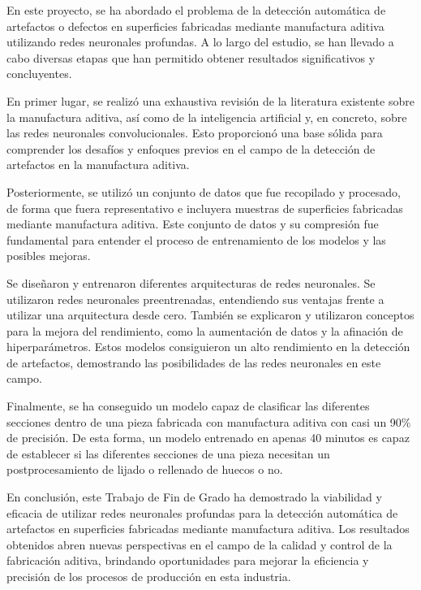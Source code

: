 \documentclass{report}
\begin{document}
En este proyecto, se ha abordado el problema de la detección automática de artefactos o defectos en superficies fabricadas mediante manufactura aditiva utilizando redes neuronales profundas. A lo largo del estudio, se han llevado a cabo diversas etapas que han permitido obtener resultados significativos y concluyentes.

En primer lugar, se realizó una exhaustiva revisión de la literatura existente sobre la manufactura aditiva, así como de la inteligencia artificial y, en concreto, sobre las redes neuronales convolucionales. Esto proporcionó una base sólida para comprender los desafíos y enfoques previos en el campo de la detección de artefactos en la manufactura aditiva.

Posteriormente, se utilizó un conjunto de datos que fue recopilado y procesado, de forma que fuera representativo e incluyera muestras de superficies fabricadas mediante manufactura aditiva. Este conjunto de datos y su compresión fue fundamental para entender el proceso de entrenamiento de los modelos y las posibles mejoras.

Se diseñaron y entrenaron diferentes arquitecturas de redes neuronales. Se utilizaron redes neuronales preentrenadas, entendiendo sus ventajas frente a utilizar una arquitectura desde cero. También se explicaron y utilizaron conceptos para la mejora del rendimiento, como la aumentación de datos y la afinación de hiperparámetros. Estos modelos consiguieron un alto rendimiento en la detección de artefactos, demostrando las posibilidades de las redes neuronales en este campo.

Finalmente, se ha conseguido un modelo capaz de clasificar las diferentes secciones dentro de una pieza fabricada con manufactura aditiva con casi un 90\% de precisión. De esta forma, un modelo entrenado en apenas 40 minutos es capaz de establecer si las diferentes secciones de una pieza necesitan un postprocesamiento de lijado o rellenado de huecos o no.

En conclusión, este Trabajo de Fin de Grado ha demostrado la viabilidad y eficacia de utilizar redes neuronales profundas para la detección automática de artefactos en superficies fabricadas mediante manufactura aditiva. Los resultados obtenidos abren nuevas perspectivas en el campo de la calidad y control de la fabricación aditiva, brindando oportunidades para mejorar la eficiencia y precisión de los procesos de producción en esta industria.
\end{document}
